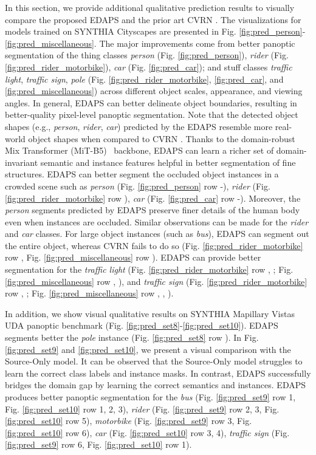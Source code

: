 \documentclass[10pt,twocolumn,letterpaper]{article}
\begin{document}
In this section, we provide additional qualitative prediction results to visually compare the proposed EDAPS and the prior art CVRN \cite{huang2021cross}. 
The visualizations for models trained on SYNTHIA  Cityscapes are presented in Fig. \ref{fig:pred_person}-\ref{fig:pred_miscellaneous}.
The major improvements come from better panoptic segmentation of the thing classes \emph{person} (Fig. \ref{fig:pred_person}), \emph{rider}  (Fig. \ref{fig:pred_rider_motorbike}), 
\emph{car} (Fig. \ref{fig:pred_car}); and stuff classes \emph{traffic light}, \emph{traffic sign}, \emph{pole} (Fig. \ref{fig:pred_rider_motorbike}, \ref{fig:pred_car}, and \ref{fig:pred_miscellaneous})
across different object scales, appearance, and viewing angles. 
In general, EDAPS can better delineate object boundaries, resulting in better-quality pixel-level panoptic segmentation.
Note that the detected object shapes (e.g., \emph{person}, \emph{rider}, \emph{car}) predicted by the EDAPS resemble more real-world object shapes when compared to CVRN \cite{huang2021cross}.
Thanks to the domain-robust Mix Transformer (MiT-B5)~\cite{xie2021segformer} backbone, 
EDAPS can learn a richer set of domain-invariant semantic and instance features helpful in better segmentation of fine structures.
EDAPS can better segment the occluded object instances in a crowded scene such as 
\emph{person} (Fig. \ref{fig:pred_person} row -), 
\emph{rider} (Fig. \ref{fig:pred_rider_motorbike} row ),
\emph{car} (Fig. \ref{fig:pred_car} row -).
Moreover, the \emph{person} segments predicted by EDAPS preserve finer details of the human body even when instances are occluded.
Similar observations can be made for the \emph{rider} and \emph{car} classes.
For large object instances (such as \emph{bus}), EDAPS can segment out the entire object, whereas CVRN fails to do so (Fig. \ref{fig:pred_rider_motorbike} row , Fig. \ref{fig:pred_miscellaneous} row ).
EDAPS can provide better segmentation for the \emph{traffic light} 
(Fig. \ref{fig:pred_rider_motorbike}  row , ; Fig. \ref{fig:pred_miscellaneous} row , ), and 
\emph{traffic sign} 
(Fig. \ref{fig:pred_rider_motorbike}  row , ; Fig. \ref{fig:pred_miscellaneous} row , , ).

In addition, we show visual qualitative results on SYNTHIA  Mapillary Vistas UDA panoptic benchmark 
(Fig. \ref{fig:pred_set8}-\ref{fig:pred_set10}).
EDAPS segments better the \emph{pole} instance (Fig. \ref{fig:pred_set8} row ).
In Fig. \ref{fig:pred_set9} and \ref{fig:pred_set10}, we present a visual comparison 
with the Source-Only model.
It can be observed that the Source-Only model struggles to learn the correct class labels and instance masks. In contrast, EDAPS successfully bridges the domain gap by learning the correct semantics and instances.
EDAPS produces better panoptic segmentation for 
the \emph{bus} (Fig. \ref{fig:pred_set9} row 1, Fig. \ref{fig:pred_set10} row 1, 2, 3),
\emph{rider} (Fig. \ref{fig:pred_set9} row 2, 3, Fig. \ref{fig:pred_set10} row 5),
\emph{motorbike} (Fig. \ref{fig:pred_set9} row 3, Fig. \ref{fig:pred_set10} row 6),
\emph{car} (Fig. \ref{fig:pred_set10} row 3, 4),
\emph{traffic sign} (Fig. \ref{fig:pred_set9} row 6, Fig. \ref{fig:pred_set10} row 1).
\end{document}

